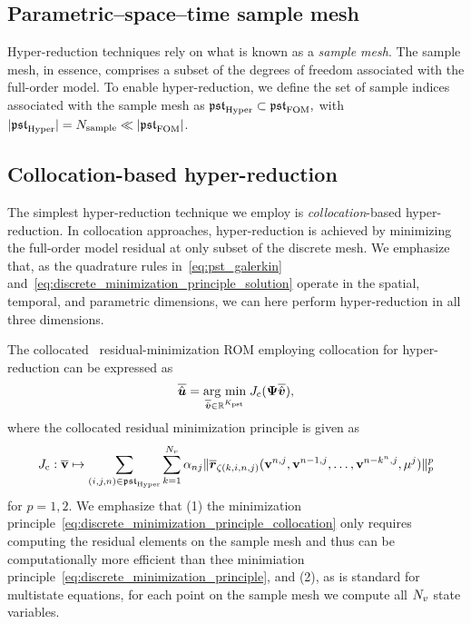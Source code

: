 \documentclass[3p,computermodern,10pt]{elsarticle}
\begin{document}
\subsection{Parametric--space--time sample mesh}
Hyper-reduction techniques rely on what is known as a \textit{sample mesh}. The sample mesh, in essence, comprises a subset of the degrees of freedom associated with the full-order model. To enable hyper-reduction, we define the set of sample indices associated with the sample mesh as $\mathfrak{pst}_{\text{Hyper}} \subset \mathfrak{pst}_{\text{FOM}},$
with $|\mathfrak{pst}_{\text{Hyper}}| = N_{\text{sample}} \ll |\mathfrak{pst}_{\text{FOM}}|$.

\subsection{Collocation-based hyper-reduction}
The simplest hyper-reduction technique we employ is \textit{collocation}-based hyper-reduction. In collocation approaches, hyper-reduction is achieved by minimizing the full-order model residual at only subset of the discrete mesh. We emphasize that, as the quadrature rules in~\eqref{eq:pst_galerkin} and~\eqref{eq:discrete_minimization_principle_solution} operate in the spatial, temporal, and parametric dimensions, we can here perform hyper-reduction in all three dimensions. 

The collocated \parametricSpaceTimeAcronym\ residual-minimization ROM employing collocation for hyper-reduction can be expressed as
\begin{equation}\label{eq:discrete_minimization_principle_solution}
\overline{\hat{\boldsymbol u}} = \underset{\overline{\hat{\boldsymbol v}} \in \mathbb{R}^{K_{\text{pst}}} }{\text{arg min} } \; J_{\text{c}}( \mathbf{ \Psi} \overline{\hat{\boldsymbol v}}),
\end{equation}
where the collocated residual minimization principle is given as 
\begin{equation}\label{eq:discrete_minimization_principle_collocation}
J_{\text{c}} : \overline{\mathbf{v}}  \mapsto \sum_{(i,j,n) \in \mathfrak{pst}_{\text{Hyper}}} \sum_{k=1}^{N_v} \alpha_{nj} \| \overline{\boldsymbol{r}}_{\zeta(k,i,n,j)} (\mathbf{v}^{n,j},\mathbf{v}^{n-1,j},\ldots,\mathbf{v}^{n-k^n,j},\mathbf{\mu}^j) \|_{p}^p
\end{equation}
for $p=1,2$. We emphasize that (1) the minimization principle~\eqref{eq:discrete_minimization_principle_collocation} only requires computing the residual elements on the sample mesh and thus can be computationally more efficient than thee minimiation principle~\eqref{eq:discrete_minimization_principle}, and (2), as is standard for multistate equations, for each point on the sample mesh we compute all $N_v$ state variables. 
\end{document}
